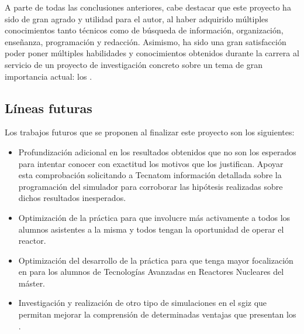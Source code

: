 A parte de todas las conclusiones anteriores, cabe destacar que este proyecto ha sido de gran agrado y utilidad para el autor, al haber adquirido múltiples conocimientos tanto técnicos como de búsqueda de información, organización, enseñanza, programación y redacción. Asimismo, ha sido una gran satisfacción poder poner múltiples habilidades y conocimientos obtenidos durante la carrera al servicio de un proyecto de investigación concreto sobre un tema de gran importancia actual: los .


\newpage
\subsection{Líneas futuras}

Los trabajos futuros que se proponen al finalizar este proyecto son los siguientes:

\begin{itemize}
    \item Profundización adicional en los resultados obtenidos que no son los esperados para intentar conocer con exactitud los motivos que los justifican. Apoyar esta comprobación solicitando a Tecnatom información detallada sobre la programación del simulador para corroborar las hipótesis realizadas sobre dichos resultados inesperados.
    \item Optimización de la práctica para que involucre más activamente a todos los alumnos asistentes a la misma y todos tengan la oportunidad de operar el reactor.
    \item Optimización del desarrollo de la práctica para que tenga mayor focalización en  para los alumnos de Tecnologías Avanzadas en Reactores Nucleares del máster.
    \item Investigación y realización de otro tipo de simulaciones en el \acrshort{sgiz} que permitan mejorar la comprensión de determinadas ventajas que presentan los .
\end{itemize}